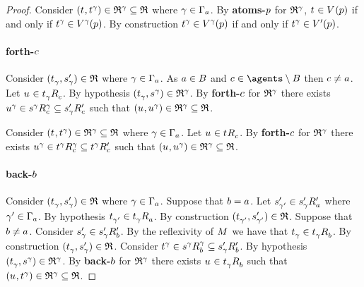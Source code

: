 \begin{proof}
Consider $(\kStateT, \kStateT[\gamma]) \in \refinement^\gamma \subseteq \refinement$ where $\gamma \in \Gamma_\agentA$.
By {\bf atoms-$\atomP$} for $\refinement^\gamma$, $\kStateT \in \kValuation(\atomP)$ if and only if $\kStateT[\gamma] \in \kValuation[\gamma](\atomP)$.
By construction $\kStateT[\gamma] \in \kValuation[\gamma](\atomP)$ if and only if $\kStateT[\gamma] \in \kValuationP(\atomP)$.

\paragraph{forth-$\agentC$}
Consider $(\kStateT_\gamma, \kStateSP_\gamma) \in \refinement$ where $\gamma \in \Gamma_\agentA$.
As $\agentA \in \agentsB$ and $\agentC \in \agents \setminus \agentsB$ then $\agentC \neq \agentA$.
Let $\kStateU \in \kSuccessorsC{\kStateT_\gamma}$.
By hypothesis $(\kStateT_\gamma, \kStateS[\gamma]) \in \refinement^\gamma$.
By {\bf forth-$\agentC$} for $\refinement^\gamma$ there exists $\kStateU[\gamma] \in \kSuccessorsC[\gamma]{\kStateS[\gamma]} \subseteq \kSuccessorsPC{\kStateSP_\gamma}$ such that $(\kStateU, \kStateU[\gamma]) \in \refinement^\gamma \subseteq \refinement$.

Consider $(\kStateT, \kStateT[\gamma]) \in \refinement^\gamma \subseteq \refinement$ where $\gamma \in \Gamma_\agentA$.
Let $\kStateU \in \kSuccessorsC{\kStateT}$.
By {\bf forth-$\agentC$} for $\refinement^\gamma$ there exists $\kStateU[\gamma] \in \kSuccessorsC[\gamma]{\kStateT[\gamma]} \subseteq \kSuccessorsPC{\kStateT[\gamma]}$ such that $(\kStateU, \kStateU[\gamma]) \in \refinement^\gamma \subseteq \refinement$.

\paragraph{back-$\agentB$}
Consider $(\kStateT_\gamma, \kStateSP_\gamma) \in \refinement$ where $\gamma \in \Gamma_\agentA$.
Suppose that $\agentB = \agentA$.
Let $\kStateSP_{\gamma'} \in \kSuccessorsPA{\kStateSP_\gamma}$ where $\gamma' \in \Gamma_\agentA$.
By hypothesis $\kStateT_{\gamma'} \in \kSuccessorsA{\kStateT_\gamma}$.
By construction $(\kStateT_{\gamma'}, \kStateSP_{\gamma'}) \in \refinement$.
Suppose that $\agentB \neq \agentA$.
Consider $\kStateSP_\gamma \in \kSuccessorsPB{\kStateSP_\gamma}$.
By the reflexivity of $\kModel$ we have that $\kStateT_\gamma \in \kSuccessorsB{\kStateT_\gamma}$.
By construction $(\kStateT_\gamma, \kStateSP_\gamma) \in \refinement$.
Consider $\kStateT[\gamma] \in \kSuccessorsB[\gamma]{\kStateS[\gamma]} \subseteq \kSuccessorsPB{\kStateSP_\gamma}$.
By hypothesis $(\kStateT_\gamma, \kStateS[\gamma]) \in \refinement^\gamma$.
By {\bf back-$\agentB$} for $\refinement^\gamma$ there exists $\kStateU \in \kSuccessorsB{\kStateT_\gamma}$ such that $(\kStateU, \kStateT[\gamma]) \in \refinement^\gamma \subseteq \refinement$.


\end{proof}

